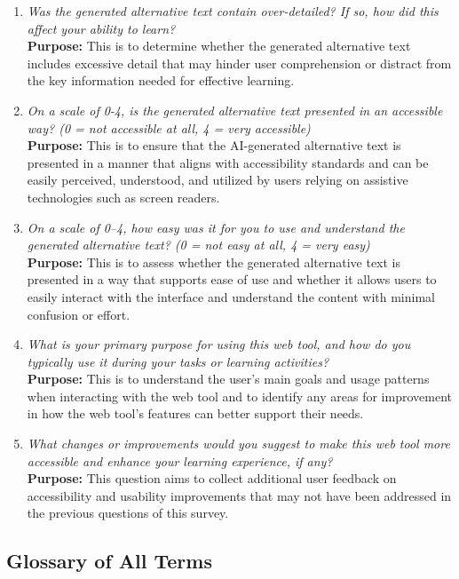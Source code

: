 \documentclass[12pt, titlepage]{article}
\begin{document}
\begin{enumerate}[label=UA-Q \arabic*., wide=0pt, leftmargin=*]
\item \emph{Was the generated alternative text contain over-detailed?
    If so, how did this affect
  your ability to learn?}\\[2mm]
  {\bf Purpose:} This is to determine whether the generated
  alternative text includes excessive detail that may hinder user
  comprehension or distract from the key information needed for
  effective learning.

\item \emph{On a scale of 0-4, is the generated alternative text
    presented in an accessible way? (0 = not accessible at all, 4 =
  very accessible)}\\[2mm]
  {\bf Purpose:} This is to ensure that the AI-generated alternative
  text is presented in a manner that aligns with accessibility standards and
  can be easily perceived, understood, and utilized by users relying
  on assistive technologies such as screen readers.

\item \emph{On a scale of 0–4, how easy was it for you to use and
    understand the generated alternative text? (0 = not easy at all, 4
  = very easy)}\\[2mm]
  {\bf Purpose:} This is to assess whether the generated alternative
  text is presented in a way that supports ease of use and whether it
  allows users to easily interact with
  the interface and understand the content with minimal confusion or effort.

\item \emph{What is your primary purpose for using this web tool, and
  how do you typically use it during your tasks or learning activities?}\\[2mm]
  {\bf Purpose:} This is to understand the user’s main goals and
  usage patterns when interacting with the web tool and to identify
  any areas for improvement in how the web tool's features
  can better support their needs.

\item \emph{What changes or improvements would you suggest to make
    this web tool more accessible and enhance your learning experience,
  if any?}\\[2mm]
  {\bf Purpose:} This question aims to collect additional user
  feedback on accessibility and usability improvements that may not
  have been addressed in the previous questions of this survey.
\end{enumerate}

\subsection{Glossary of All Terms}
\end{document}
